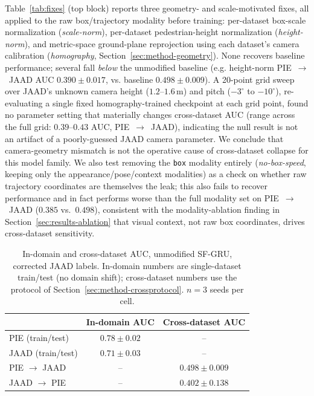 Table~\ref{tab:fixes} (top block) reports three geometry- and
scale-motivated fixes, all applied to the raw box/trajectory modality
before training: per-dataset box-scale normalization
(\emph{scale-norm}), per-dataset pedestrian-height normalization
(\emph{height-norm}), and metric-space ground-plane reprojection using
each dataset's camera calibration (\emph{homography},
Section~\ref{sec:method-geometry}). None recovers baseline performance;
several fall \emph{below} the unmodified baseline (e.g. height-norm
PIE~$\to$~JAAD AUC $0.390\pm0.017$, vs. baseline $0.498\pm0.009$). A
20-point grid sweep over JAAD's unknown camera height
($1.2$--$1.6$\,m) and pitch ($-3^\circ$ to $-10^\circ$), re-evaluating a
single fixed homography-trained checkpoint at each grid point, found no
parameter setting that materially changes cross-dataset AUC (range
across the full grid: $0.39$--$0.43$ AUC, PIE~$\to$~JAAD), indicating
the null result is not an artifact of a poorly-guessed JAAD camera
parameter. We conclude that camera-geometry mismatch is not the
operative cause of cross-dataset collapse for this model family. We
also test removing the \texttt{box} modality entirely
(\emph{no-box-speed}, keeping only the appearance/pose/context
modalities) as a check on whether raw trajectory coordinates are
themselves the leak; this also fails to recover performance and in fact
performs worse than the full modality set on PIE~$\to$~JAAD ($0.385$
vs.\ $0.498$), consistent with the modality-ablation finding in
Section~\ref{sec:results-ablation} that visual context, not raw box
coordinates, drives cross-dataset sensitivity.

\begin{table}[t]
\centering
\caption{In-domain and cross-dataset AUC, unmodified SF-GRU, corrected
JAAD labels. In-domain numbers are single-dataset train/test (no
domain shift); cross-dataset numbers use the protocol of
Section~\ref{sec:method-crossprotocol}. $n=3$ seeds per cell.}
\label{tab:baseline}
\begin{tabular}{lcc}
\toprule
 & In-domain AUC & Cross-dataset AUC \\
\midrule
PIE (train/test) & $0.78\pm0.02$ & -- \\
JAAD (train/test) & $0.71\pm0.03$ & -- \\
PIE $\to$ JAAD & -- & $0.498\pm0.009$ \\
JAAD $\to$ PIE & -- & $0.402\pm0.138$ \\
\bottomrule
\end{tabular}
\end{table}

